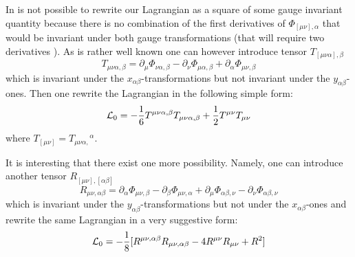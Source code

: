 \documentclass[a4paper,12pt]{article}
\begin{document}
In is not possible to rewrite our Lagrangian as a square of some gauge
invariant quantity because there is no combination of the first
derivatives of $\Phi_{[\mu\nu],\alpha}$ that would be invariant
under both gauge transformations (that will require two derivatives 
\cite{BB02,MH02}). As is rather well known one can however introduce tensor
$T_{[\mu\nu\alpha],\beta}$
\begin{equation}
T_{\mu\nu\alpha,\beta} = \partial_\mu \Phi_{\nu\alpha,\beta} - \partial_\nu
\Phi_{\mu\alpha,\beta} + \partial_\alpha \Phi_{\mu\nu,\beta}
\end{equation}
which is invariant under the $x_{\alpha\beta}$-transformations but not
invariant under the $y_{\alpha\beta}$-ones. Then one rewrite the Lagrangian
in the following simple form:
\begin{equation}
{\cal L}_0 = - \frac{1}{6} T^{\mu\nu\alpha,\beta} T_{\mu\nu\alpha,\beta}
+ \frac{1}{2} T^{\mu\nu} T_{\mu\nu}
\end{equation}
where $T_{[\mu\nu]} = T_{\mu\nu\alpha,}{}^\alpha$.

It is interesting that there exist one more possibility. Namely, one can
introduce another tensor $R_{[\mu\nu],[\alpha\beta]}$
\begin{equation}
R_{\mu\nu,\alpha\beta} = \partial_\alpha \Phi_{\mu\nu,\beta} - \partial_\beta
\Phi_{\mu\nu,\alpha} + \partial_\mu \Phi_{\alpha\beta,\nu} - \partial_\nu
\Phi_{\alpha\beta,\nu}
\end{equation}
which is invariant under the $y_{\alpha\beta}$-transformations but not
under the $x_{\alpha\beta}$-ones and rewrite the same Lagrangian in a
very suggestive form:
\begin{equation}
{\cal L}_0 = - \frac{1}{8} [ R^{\mu\nu,\alpha\beta} R_{\mu\nu,\alpha\beta}
- 4 R^{\mu\nu} R_{\mu\nu} + R^2 ]
\end{equation}
\end{document}

